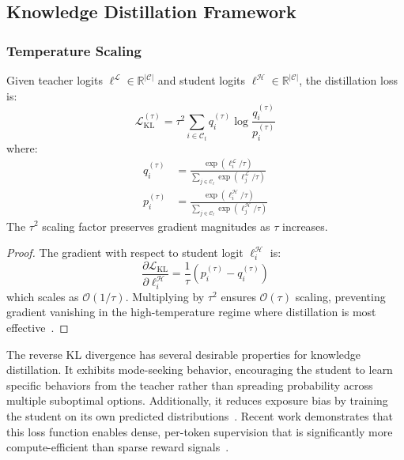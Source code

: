 \subsection{Knowledge Distillation Framework}
\label{sec:method-kl}

\subsubsection{Temperature Scaling}

\begin{theorem}
    \label{thm:temp-scaling}
    Given teacher logits $\boldsymbol{\ell}^{\mathcal{L}} \in \mathbb{R}^{|\mathcal{C}|}$ and student logits $\boldsymbol{\ell}^{\mathcal{H}} \in \mathbb{R}^{|\mathcal{C}|}$, the distillation loss is:
    \begin{equation}
        \mathcal{L}_{\text{KL}}^{(\tau)} = \tau^2 \sum_{i \in \mathcal{C}_t} q_i^{(\tau)} \log \frac{q_i^{(\tau)}}{p_i^{(\tau)}}
        \label{eq:distill-loss}
    \end{equation}
    where:
    \begin{align}
        q_i^{(\tau)} & = \frac{\exp(\ell_i^{\mathcal{L}} / \tau)}{\sum_{j \in \mathcal{C}_t} \exp(\ell_j^{\mathcal{L}} / \tau)} \label{eq:teacher-dist} \\
        p_i^{(\tau)} & = \frac{\exp(\ell_i^{\mathcal{H}} / \tau)}{\sum_{j \in \mathcal{C}_t} \exp(\ell_j^{\mathcal{H}} / \tau)} \label{eq:student-dist}
    \end{align}
    The $\tau^2$ scaling factor preserves gradient magnitudes as $\tau$ increases.
\end{theorem}

\begin{proof}
    The gradient with respect to student logit $\ell_i^{\mathcal{H}}$ is:
    \begin{equation}
        \frac{\partial \mathcal{L}_{\text{KL}}}{\partial \ell_i^{\mathcal{H}}} = \frac{1}{\tau}(p_i^{(\tau)} - q_i^{(\tau)})
    \end{equation}
    which scales as $\mathcal{O}(1/\tau)$. Multiplying by $\tau^2$ ensures $\mathcal{O}(\tau)$ scaling, preventing gradient vanishing in the high-temperature regime where distillation is most effective~\cite{hintonDistillingKnowledgeNeural2015}.
\end{proof}

The reverse KL divergence has several desirable properties for knowledge distillation. It exhibits mode-seeking behavior, encouraging the student to learn specific behaviors from the teacher rather than spreading probability across multiple suboptimal options. Additionally, it reduces exposure bias by training the student on its own predicted distributions~\cite{OnPolicyDistillation}. Recent work demonstrates that this loss function enables dense, per-token supervision that is significantly more compute-efficient than sparse reward signals~\cite{OnPolicyDistillation}.

